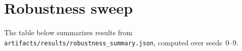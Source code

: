 \section{Robustness sweep}\label{app:robustness}

The table below summarizes results from \texttt{artifacts/results/robustness\_summary.json}, computed over seeds~0--9.


